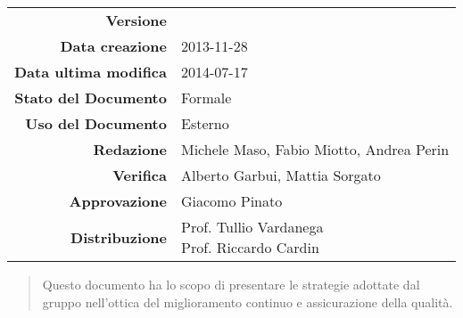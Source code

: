 

\newcommand{\Versione}{\versionePianoDiQualifica{}}	%
\newcommand{\Data}{2013-11-28}						%
\newcommand{\DataUltimaModifica}{2014-07-17}
\newcommand{\TipoDocumento}{Piano di Qualifica}		%





\begin{center}
\begin{tabular}{r|l}
\textbf{Versione} & \Versione{} \\
\textbf{Data creazione} & \Data{} \\
\textbf{Data ultima modifica} & \DataUltimaModifica{} \\
\textbf{Stato del Documento} & Formale \\		%
\textbf{Uso del Documento} & Esterno \\			%
\textbf{Redazione} & Michele Maso, Fabio Miotto, Andrea Perin\\			%
\textbf{Verifica} & Alberto Garbui, Mattia Sorgato\\%
\textbf{Approvazione} & Giacomo Pinato\\				%
\textbf{Distribuzione} & \parbox[t]{4cm}{Prof. Tullio Vardanega \\ Prof. Riccardo Cardin \\ \Prop{} }
\end{tabular}
\end{center}

\vspace{0.05in}

\begin{abstract}
\begin{center}
Questo documento ha lo scopo di presentare le strategie adottate dal gruppo \NomeGruppo{} nell'ottica del miglioramento continuo e assicurazione della qualità.
\end{center}
\end{abstract}

